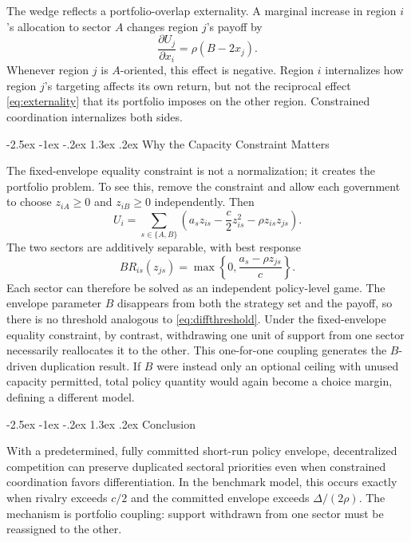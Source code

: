 \documentclass[12pt]{article}
\makeatletter
\renewcommand\section{\@startsection{section}{1}{\z@}%
  {-2.5ex \@plus -1ex \@minus -.2ex}%
  {1.3ex \@plus .2ex}%
  {\centering\normalfont\fontsize{14}{16}\selectfont\bfseries}}
\makeatother
\begin{document}
The wedge reflects a portfolio-overlap externality. A marginal increase in region $i$'s allocation to sector $A$ changes region $j$'s payoff by
\begin{equation}
\frac{\partial U_j}{\partial x_i}=\rho(B-2x_j).
\label{eq:externality}
\end{equation}
Whenever region $j$ is $A$-oriented, this effect is negative. Region $i$ internalizes how region $j$'s targeting affects its own return, but not the reciprocal effect \eqref{eq:externality} that its portfolio imposes on the other region. Constrained coordination internalizes both sides.

\section{Why the Capacity Constraint Matters}

The fixed-envelope equality constraint is not a normalization; it creates the portfolio problem. To see this, remove the constraint and allow each government to choose $z_{iA}\ge0$ and $z_{iB}\ge0$ independently. Then
\begin{equation}
U_i=\sum_{s\in\{A,B\}}
\left(a_s z_{is}-\frac{c}{2}z_{is}^2-\rho z_{is}z_{js}\right).
\label{eq:unconstrained}
\end{equation}
The two sectors are additively separable, with best response
\[
BR_{is}(z_{js})=
\max\left\{0,\frac{a_s-\rho z_{js}}{c}\right\}.
\]
Each sector can therefore be solved as an independent policy-level game. The envelope parameter $B$ disappears from both the strategy set and the payoff, so there is no threshold analogous to \eqref{eq:diffthreshold}. Under the fixed-envelope equality constraint, by contrast, withdrawing one unit of support from one sector necessarily reallocates it to the other. This one-for-one coupling generates the $B$-driven duplication result. If $B$ were instead only an optional ceiling with unused capacity permitted, total policy quantity would again become a choice margin, defining a different model.

\section{Conclusion}

With a predetermined, fully committed short-run policy envelope, decentralized competition can preserve duplicated sectoral priorities even when constrained coordination favors differentiation. In the benchmark model, this occurs exactly when rivalry exceeds $c/2$ and the committed envelope exceeds $\Delta/(2\rho)$. The mechanism is portfolio coupling: support withdrawn from one sector must be reassigned to the other.
\end{document}
